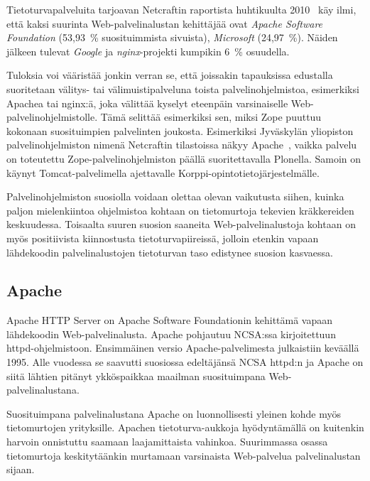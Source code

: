Tietoturvapalveluita tarjoavan Netcraftin raportista
huhtikuulta 2010~\cite{netcraft} käy ilmi, että kaksi suurinta
Web-palvelinalustan kehittäjää ovat \textit{Apache Software Foundation} (53,93~\% suosituimmista
sivuista), \textit{Microsoft} (24,97~\%). Näiden jälkeen tulevat
\textit{Google} ja \textit{nginx}-projekti kumpikin 6~\% osuudella.

Tuloksia voi vääristää jonkin verran se, että joissakin tapauksissa
edustalla suoritetaan välitys- tai välimuistipalveluna toista
palvelinohjelmistoa, esimerkiksi Apachea tai nginx:ä, joka välittää
kyselyt eteenpäin varsinaiselle
Web-pal\-ve\-lin\-oh\-jel\-mis\-tol\-le. Tämä selittää esimerkiksi
sen, miksi Zope puuttuu kokonaan suosituimpien palvelinten
joukosta. Esimerkiksi Jyväskylän yliopiston palvelinohjelmiston nimenä
Netcraftin tilastoissa näkyy Apache~\cite{netcraft_jyu}, vaikka
palvelu on toteutettu Zope-pal\-ve\-lin\-oh\-jel\-mis\-ton päällä
suoritettavalla Plonella. Samoin on käynyt Tomcat-pal\-ve\-li\-mel\-la
ajettavalle Korppi-o\-pin\-to\-tie\-to\-jär\-jes\-tel\-mäl\-le.

Palvelinohjelmiston suosiolla voidaan olettaa olevan vaikutusta
siihen, kuinka paljon mielenkiintoa ohjelmistoa kohtaan on
tietomurtoja tekevien kräkkereiden keskuudessa. Toisaalta
suuren suosion saaneita Web-palvelinalustoja kohtaan on myös
positiivista kiinnostusta tietoturvapiireissä, jolloin etenkin vapaan
lähdekoodin palvelinalustojen tietoturvan taso edistynee suosion
kasvaessa.

\subsection{Apache}

Apache HTTP Server on Apache Software Foundationin kehittämä vapaan
lähdekoodin Web-palvelinalusta. Apache pohjautuu NCSA:ssa
kirjoitettuun httpd-oh\-jel\-mis\-toon. Ensimmäinen versio
Apache-palvelimesta julkaistiin keväällä 1995. Alle vuodessa se
saavutti suosiossa edeltäjänsä NCSA httpd:n ja Apache on siitä lähtien
pitänyt ykköspaikkaa maailman suosituimpana Web-palvelinalustana.~\cite{apache}

Suosituimpana palvelinalustana Apache on luonnollisesti yleinen kohde
myös tietomurtojen yrityksille. Apachen tietoturva-aukkoja
hyödyntämällä on kuitenkin harvoin onnistuttu saamaan laajamittaista
vahinkoa. Suurimmassa osassa tietomurtoja keskitytäänkin murtamaan
varsinaista Web-palvelua palvelinalustan
sijaan.  %

